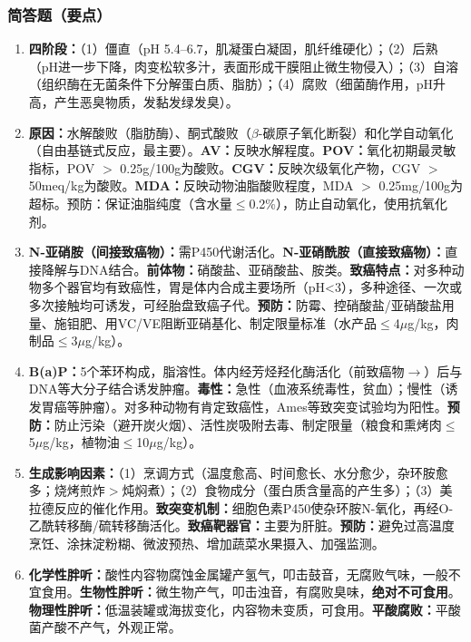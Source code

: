 {\subsubsection*{简答题（要点）}

\begin{enumerate}[leftmargin=*, itemsep=6pt]
    \item \textbf{四阶段：}（1）僵直（pH 5.4--6.7，肌凝蛋白凝固，肌纤维硬化）；（2）后熟（pH进一步下降，肉变松软多汁，表面形成干膜阻止微生物侵入）；（3）自溶（组织酶在无菌条件下分解蛋白质、脂肪）；（4）腐败（细菌酶作用，pH升高，产生恶臭物质，发黏发绿发臭）。

    \item \textbf{原因：}水解酸败（脂肪酶）、酮式酸败（$\beta$-碳原子氧化断裂）和化学自动氧化（自由基链式反应，最主要）。\textbf{AV：}反映水解程度。\textbf{POV：}氧化初期最灵敏指标，POV $>$ 0.25g/100g为酸败。\textbf{CGV：}反映次级氧化产物，CGV $>$ 50meq/kg为酸败。\textbf{MDA：}反映动物油脂酸败程度，MDA $>$ 0.25mg/100g为超标。预防：保证油脂纯度（含水量$\leq$0.2\%），防止自动氧化，使用抗氧化剂。

    \item \textbf{N-亚硝胺（间接致癌物）：}需P450代谢活化。\textbf{N-亚硝酰胺（直接致癌物）：}直接降解与DNA结合。\textbf{前体物：}硝酸盐、亚硝酸盐、胺类。\textbf{致癌特点：}对多种动物多个器官均有致癌性，胃是体内合成主要场所（pH<3），多种途径、一次或多次接触均可诱发，可经胎盘致癌子代。\textbf{预防：}防霉、控硝酸盐/亚硝酸盐用量、施钼肥、用VC/VE阻断亚硝基化、制定限量标准（水产品$\leq$4$\mu$g/kg，肉制品$\leq$3$\mu$g/kg）。

    \item \textbf{B(a)P：}5个苯环构成，脂溶性。体内经芳烃羟化酶活化（前致癌物$\rightarrow$）后与DNA等大分子结合诱发肿瘤。\textbf{毒性：}急性（血液系统毒性，贫血）；慢性（诱发胃癌等肿瘤）。对多种动物有肯定致癌性，Ames等致突变试验均为阳性。\textbf{预防：}防止污染（避开炭火烟）、活性炭吸附去毒、制定限量（粮食和熏烤肉$\leq$5$\mu$g/kg，植物油$\leq$10$\mu$g/kg）。

    \item \textbf{生成影响因素：}（1）烹调方式（温度愈高、时间愈长、水分愈少，杂环胺愈多；烧烤煎炸$>$炖焖煮）；（2）食物成分（蛋白质含量高的产生多）；（3）美拉德反应的催化作用。\textbf{致突变机制：}细胞色素P450使杂环胺N-氧化，再经O-乙酰转移酶/硫转移酶活化。\textbf{致癌靶器官：}主要为肝脏。\textbf{预防：}避免过高温度烹饪、涂抹淀粉糊、微波预热、增加蔬菜水果摄入、加强监测。

    \item \textbf{化学性胖听：}酸性内容物腐蚀金属罐产氢气，叩击鼓音，无腐败气味，一般不宜食用。\textbf{生物性胖听：}微生物产气，叩击浊音，有腐败臭味，\textbf{绝对不可食用}。\textbf{物理性胖听：}低温装罐或海拔变化，内容物未变质，可食用。\textbf{平酸腐败：}平酸菌产酸不产气，外观正常。


\end{enumerate}}
